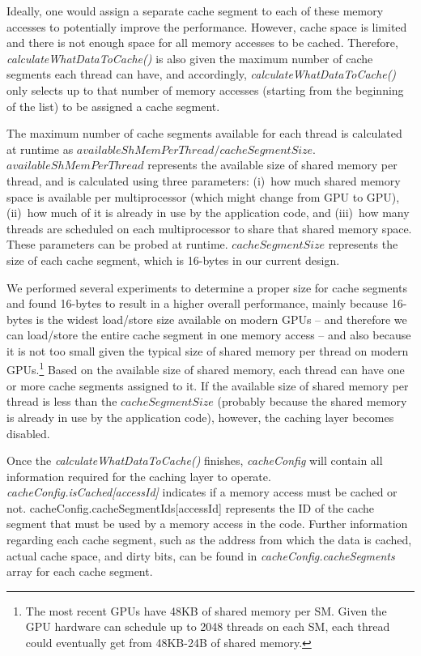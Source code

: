 Ideally, one would assign a separate cache segment to each of these memory accesses to potentially improve the
performance. However, cache space is limited and there is not enough space for all memory accesses to be cached.
Therefore, {\it calculateWhatDataToCache()} is also given the maximum number of cache segments each thread can have, and
accordingly, {\it calculateWhatDataToCache()} only selects up to that number of memory accesses (starting from the
beginning of the list) to be assigned a cache segment.

The maximum number of cache segments available for each thread is calculated at runtime as $availableShMemPerThread /
cacheSegmentSize$. $availableShMemPerThread$ represents the available size of shared memory per thread, and is
calculated using three parameters: (i)~how much shared memory space is available per multiprocessor (which might change
from GPU to GPU), (ii)~how much of it is already in use by the application code, and (iii)~how many threads are
scheduled on each multiprocessor to share that shared memory space. These parameters can be probed at runtime.
$cacheSegmentSize$ represents the size of each cache segment, which is 16-bytes in our current design.

We performed several experiments to determine a proper size for cache segments and found 16-bytes to result in a higher
overall performance, mainly because 16-bytes is the widest load/store size available on modern GPUs -- and therefore we
can load/store the entire cache segment in one memory access -- and also because it is not too small given the typical
size of shared memory per thread on modern GPUs.\footnote{The most recent GPUs have 48KB of shared memory per SM. Given
the GPU hardware can schedule up to 2048 threads on each SM, each thread could eventually get from 48KB-24B of shared
memory.} Based on the available size of shared memory, each thread can have one or more cache segments assigned to it.
If the available size of shared memory per thread is less than the $cacheSegmentSize$ (probably because the shared
memory is already in use by the application code), however, the caching layer becomes disabled.


Once the {\it calculateWhatDataToCache()} finishes, {\it cacheConfig} will contain all information required for the
caching layer to operate. {\it cacheConfig.isCached[accessId]} indicates if a memory access must be cached or not.
cacheConfig.cacheSegmentIds[accessId] represents the ID of the cache segment that must be used by a memory access in the
code. Further information regarding each cache segment, such as the address from which the data is cached, actual cache
space, and dirty bits, can be found in {\it cacheConfig.cacheSegments} array for each cache segment.

